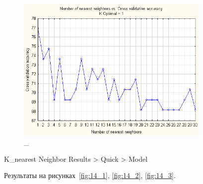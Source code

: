 \begin{figure}[!h]
  \centering

  \includegraphics[height=7cm]
  {inc/v5_14.PNG}

  \caption{\_}

  \label{fig:13}
\end{figure}



K\_nearest Neighbor Results > Quick > Model

Результаты на рисунках~\ref{fig:14_1}, \ref{fig:14_2}, \ref{fig:14_3}.

